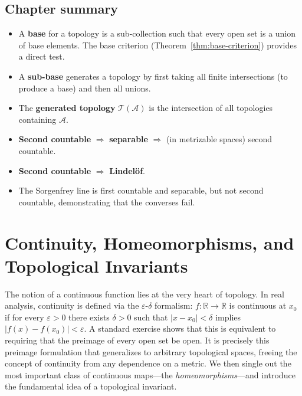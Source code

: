 \documentclass[11pt,a4paper,twoside]{book}
\theoremstyle{remark}
\theoremstyle{definition}
\theoremstyle{definition}
\begin{document}
\section*{Chapter summary}

\begin{itemize}
    \item A \textbf{base} for a topology is a sub-collection such that every
        open set is a union of base elements.  The base criterion
        (Theorem~\ref{thm:base-criterion}) provides a direct test.
    \item A \textbf{sub-base} generates a topology by first taking all finite
        intersections (to produce a base) and then all unions.
    \item The \textbf{generated topology} $\mathscr{T}(\mathscr{A})$ is the
        intersection of all topologies containing $\mathscr{A}$.
    \item \textbf{Second countable} $\Rightarrow$ \textbf{separable}
        $\Rightarrow$ (in metrizable spaces) second countable.
    \item \textbf{Second countable} $\Rightarrow$ \textbf{Lindel\"{o}f}.
    \item The Sorgenfrey line is first countable and separable, but not second
        countable, demonstrating that the converses fail.
\end{itemize}


\chapter{Continuity, Homeomorphisms, and Topological Invariants}
\label{ch:continuity}

The notion of a continuous function lies at the very heart of topology.  In
real analysis, continuity is defined via the $\varepsilon$-$\delta$ formalism:
$f\colon\mathbb{R}\to\mathbb{R}$ is continuous at $x_0$ if for every
$\varepsilon>0$ there exists $\delta>0$ such that $|x-x_0|<\delta$ implies
$|f(x)-f(x_0)|<\varepsilon$.  A standard exercise shows that this is
equivalent to requiring that the preimage of every open set be open.  It is
precisely this preimage formulation that generalizes to arbitrary topological
spaces, freeing the concept of continuity from any dependence on a metric.  We
then single out the most important class of continuous maps---the
\emph{homeomorphisms}---and introduce the fundamental idea of a topological
invariant.
\end{document}
